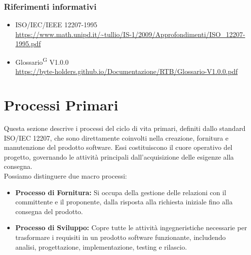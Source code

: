 \documentclass[a4paper, 11pt]{article}
\begin{document}
\subsubsection{Riferimenti informativi}
\begin{itemize}
	\item ISO/IEC/IEEE 12207-1995\\
		\url{https://www.math.unipd.it/~tullio/IS-1/2009/Approfondimenti/ISO_12207-1995.pdf}
	\item
    	Glossario\textsuperscript{G} V1.0.0\\
        \url{https://byte-holders.github.io/Documentazione/RTB/Glossario-V1.0.0.pdf}
\end{itemize}


\section{Processi Primari}
Questa sezione descrive i processi del ciclo di vita primari, definiti dallo standard ISO/IEC 12207, che sono direttamente coinvolti nella creazione, fornitura e manutenzione del prodotto software. 
Essi costituiscono il cuore operativo del progetto, governando le attività principali dall'acquisizione delle esigenze alla consegna.
\\
Possiamo distinguere due macro processi:
\begin{itemize}
    \item \textbf{Processo di Fornitura:} Si occupa della gestione delle relazioni con il committente e il proponente, dalla risposta alla richiesta iniziale fino alla consegna del prodotto.
    \item \textbf{Processo di Sviluppo:} Copre tutte le attività ingegneristiche necessarie per trasformare i requisiti in un prodotto software funzionante, includendo analisi, progettazione, implementazione, testing e rilascio.
\end{itemize}
\end{document}
